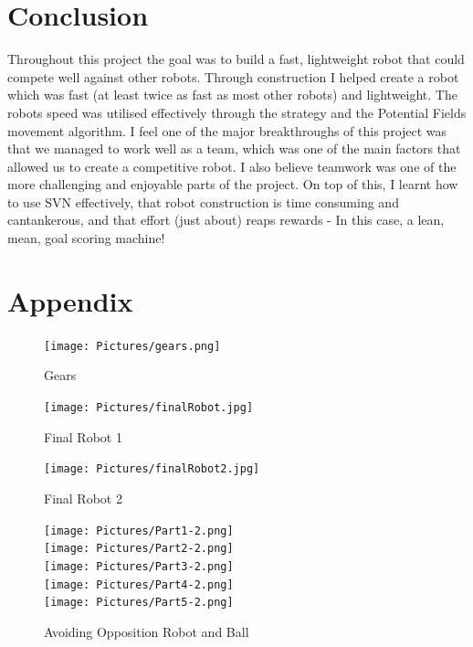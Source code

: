 \documentclass[12pt]{IEEEtran}
\begin{document}
\section{Conclusion}
Throughout this project the goal was to build a fast, lightweight robot that could compete well against other robots. Through construction I helped create a robot which was fast (at least twice as fast as most other robots) and lightweight. The robots speed was utilised effectively through the strategy and the Potential Fields movement algorithm. I feel one of the major breakthroughs of this project was that we managed to work well as a team, which was one of the main factors that allowed us to create a competitive robot. I also believe teamwork was one of the more challenging and enjoyable parts of the project. On top of this, I learnt how to use SVN effectively, that robot construction is time consuming and cantankerous, and that effort (just about) reaps rewards - In this case, a lean, mean, goal scoring machine!


\newpage

\section{Appendix}

\begin{center}

\begin{figure}[htp]
\texttt{[image: Pictures/gears.png]}
\caption{Gears}
\end{figure}

\begin{figure}[htp]
\texttt{[image: Pictures/finalRobot.jpg]}
\caption{Final Robot 1}
\end{figure}

\begin{figure}[htp]
\texttt{[image: Pictures/finalRobot2.jpg]}
\caption{Final Robot 2}
\end{figure}

\begin{figure}[htp]
\texttt{[image: Pictures/Part1-2.png]}\\
\texttt{[image: Pictures/Part2-2.png]}\\
\texttt{[image: Pictures/Part3-2.png]}\\
\texttt{[image: Pictures/Part4-2.png]}\\
\texttt{[image: Pictures/Part5-2.png]}\\
\label{fig:Avoiding Obstacles}
\caption{Avoiding Opposition Robot and Ball}
\end{figure}

\end{center}
\end{document}
